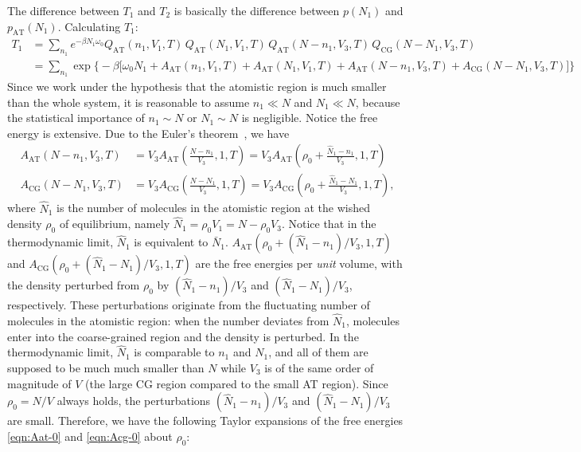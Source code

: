 \documentclass[aip,jcp,a4paper,reprint,onecolumn]{revtex4-1}
\newcommand{\redc}[1]{{\color{red} #1}}
\newcommand{\AT}{{\textrm{{AT}}}}
\newcommand{\CG}{{\textrm{CG}}}
\begin{document}
The difference between $T_1$ and $T_2$ is basically the difference
between $p(N_1)$ and $p_{\AT}(N_1)$.
Calculating $T_1$:
\begin{align}\nonumber
  T_1
  &=
  \sum_{n_1}
  e^{-\beta N_1\omega_0}
  Q_{\AT}(n_1,V_1,T)\,
  Q_{\AT}(N_1,V_1,T)\,
  Q_{\AT}(N-n_1,V_3,T)\,
  Q_{\CG}(N-N_1,V_3,T) \\\label{eqn:t1-1}
  &=
  \sum_{n_1}
  \exp
  \big\{-\beta
  \big[
  \omega_0N_1 +
  A_{\AT}(n_1,V_1,T) +
  A_{\AT}(N_1,V_1,T) +
  A_{\AT}(N-n_1,V_3,T) +
  A_{\CG}(N-N_1,V_3,T)
  \big]
  \big\}
\end{align}
Since we work under the hypothesis that the atomistic region is much smaller than the whole system, it
is reasonable to assume $n_1 \ll N$ and $N_1\ll N$, \redc{because the statistical importance of
  $n_1\sim N$ or $N_1\sim N$ is negligible.}
Notice the free energy is extensive.
Due to the Euler's theorem~\cite{tuckeman2010statistical},
we have
\begin{align}\label{eqn:Aat-0}
  A_{\AT}(N-n_1,V_3,T)
  &= V_3 A_{\AT}(\frac{N-n_1}{V_3},1,T)
  = V_3 A_{\AT}(\rho_0 + \frac{\hat N_1 - n_1}{V_3},1,T)\\\label{eqn:Acg-0}
  A_{\CG}(N-N_1,V_3,T)
  &= V_3 A_{\CG}(\frac{N-N_1}{V_3},1,T)
  = V_3 A_{\CG}(\rho_0 + \frac{\hat N_1 - N_1}{V_3},1,T),
\end{align}
where $\hat N_1$ is the number of molecules in the atomistic region
at the wished density $\rho_0$ of equilibrium, namely
$\hat N_1 = \rho_0V_1 = N - \rho_0 V_3$.
Notice \redc{that in} the thermodynamic limit, $\hat N_1$ is equivalent to
$\bar N_1$.
$A_{\AT}(\rho_0 + (\hat N_1 - n_1)/{V_3},1,T)$ and
$A_{\CG}(\rho_0 + (\hat N_1 - N_1)/{V_3},1,T)$ are
the free energies per \emph{unit} volume, with
the density perturbed from $\rho_0$ by  $(\hat N_1 - n_1)/{V_3}$
and $(\hat N_1 - N_1)/{V_3}$, respectively.
These perturbations originate from the fluctuating
number of molecules in the atomistic region: when the number
deviates from $\hat N_1$, molecules enter into the coarse-grained
region and the density is perturbed.
\redc{In} the thermodynamic
limit, $\hat N_1$ is comparable to $n_1$ and $N_1$, and all of them are
supposed to be much much smaller than $N$ while $V_3$ is of the same order of magnitude of $V$ (the large CG region compared to the small AT region).
Since $\rho_0 = N/V$ always holds, the perturbations
$(\hat N_1 - n_1)/{V_3}$
and $(\hat N_1 - N_1)/{V_3}$ are small.
Therefore, we have the following
Taylor expansions of the free energies \eqref{eqn:Aat-0} and \eqref{eqn:Acg-0}
about $\rho_0$:
\end{document}
